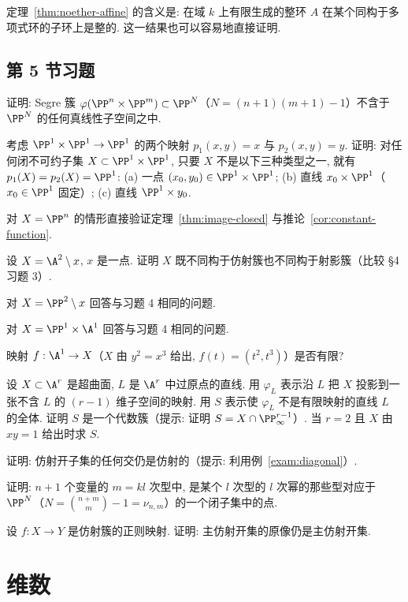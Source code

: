 定理~\ref{thm:noether-affine} 的含义是: 在域 $k$ 上有限生成的整环 $A$ 在某个同构于多项式环的子环上是整的. 这一结果也可以容易地直接证明.

\subsection{第 5 节习题}

\begin{compactenum}
	\item 证明: Segre 簇 $\varphi(\PP^n \times \PP^m) \subset \PP^N$（$N = (n+1)(m+1)-1$）不含于 $\PP^N$ 的任何真线性子空间之中.
	\item 考虑 $\PP^1 \times \PP^1 \to \PP^1$ 的两个映射 $p_1(x,y) = x$ 与 $p_2(x,y) = y$. 证明: 对任何闭不可约子集 $X \subset \PP^1 \times \PP^1$, 只要 $X$ 不是以下三种类型之一, 就有 $p_1(X) = p_2(X) = \PP^1$: (a) 一点 $(x_0, y_0) \in \PP^1 \times \PP^1$; (b) 直线 $x_0 \times \PP^1$（$x_0 \in \PP^1$ 固定）; (c) 直线 $\PP^1 \times y_0$.
	\item 对 $X = \PP^n$ 的情形直接验证定理~\ref{thm:image-closed} 与推论~\ref{cor:constant-function}.
	\item 设 $X = \A^2 \setminus x$, $x$ 是一点. 证明 $X$ 既不同构于仿射簇也不同构于射影簇（比较 §4 习题 3）.
	\item 对 $X = \PP^2 \setminus x$ 回答与习题 4 相同的问题.
	\item 对 $X = \PP^1 \times \A^1$ 回答与习题 4 相同的问题.
	\item 映射 $f: \A^1 \to X$（$X$ 由 $y^2 = x^3$ 给出, $f(t) = (t^2, t^3)$）是否有限?
	\item 设 $X \subset \A^r$ 是超曲面, $L$ 是 $\A^r$ 中过原点的直线. 用 $\varphi_L$ 表示沿 $L$ 把 $X$ 投影到一张不含 $L$ 的 $(r-1)$ 维子空间的映射. 用 $S$ 表示使 $\varphi_L$ 不是有限映射的直线 $L$ 的全体. 证明 $S$ 是一个代数簇（提示: 证明 $S = X \cap \PP^{r-1}_\infty$）. 当 $r = 2$ 且 $X$ 由 $xy = 1$ 给出时求 $S$.
	\item 证明: 仿射开子集的任何交仍是仿射的（提示: 利用例~\ref{exam:diagonal}）.
	\item 证明: $n+1$ 个变量的 $m = kl$ 次型中, 是某个 $l$ 次型的 $l$ 次幂的那些型对应于 $\PP^N$（$N = \binom{n+m}{m} - 1 = \nu_{n,m}$）的一个闭子集中的点.
	\item 设 $f: X \to Y$ 是仿射簇的正则映射. 证明: 主仿射开集的原像仍是主仿射开集.
\end{compactenum}

\section{维数}

